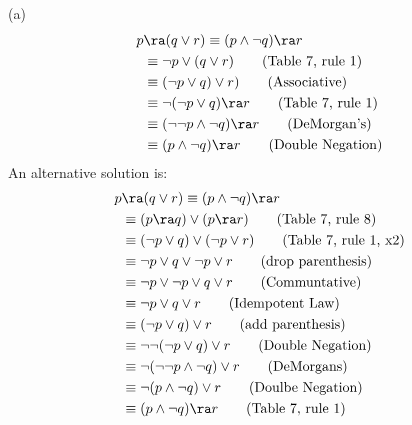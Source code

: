 \begin{questions}
\begin{solution}
    (a)
    \begin{align*}
        p &\ra (q \vee r) \equiv (p \wedge \neg q) \ra r \\
            & \equiv \neg p \vee (q \vee r) \tag{Table 7, rule 1} \\
            & \equiv (\neg p \vee q) \vee r) \tag{Associative} \\
            & \equiv \neg (\neg p \vee q) \ra r \tag{Table 7, rule 1} \\
            & \equiv (\neg \neg p \wedge \neg q) \ra r \tag{DeMorgan's} \\
            & \equiv (p \wedge \neg q) \ra r \tag{Double Negation} 
    \end{align*}
An alternative solution is:
    \begin{align*}
        p &\ra (q \vee r) \equiv (p \wedge \neg q) \ra r \\
        & \equiv (p \ra q) \vee (p \ra r) \tag{Table 7, rule 8} \\
        & \equiv (\neg p \vee q) \vee (\neg p \vee r) \tag{Table 7, rule 1, x2} \\
        & \equiv \neg p \vee q \vee \neg p \vee r \tag{drop parenthesis} \\
        & \equiv \neg p \vee \neg p \vee q \vee r \tag{Communtative} \\
        & \equiv \neg p \vee q \vee r \tag{Idempotent Law} \\
        & \equiv (\neg p \vee q) \vee r \tag{add parenthesis} \\
        & \equiv \neg \neg (\neg p \vee q) \vee r \tag{Double Negation} \\
        & \equiv \neg (\neg \neg p \wedge \neg q) \vee r \tag{DeMorgans} \\
        & \equiv \neg (p \wedge \neg q) \vee r \tag{Doulbe Negation} \\
        & \equiv (p \wedge \neg q) \ra r \tag{Table 7, rule 1}
    \end{align*}


\end{solution}
\end{questions}
